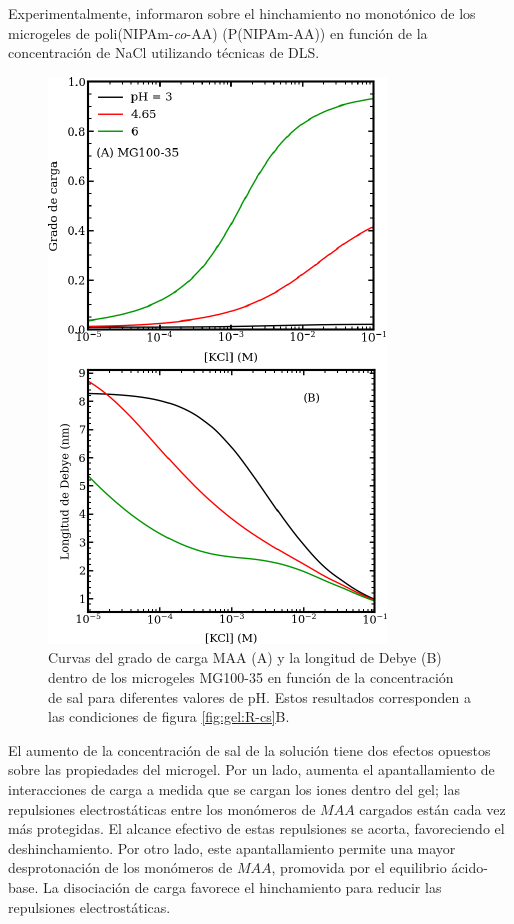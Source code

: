 Experimentalmente, \citet{CaprilesGonzalez2008} informaron sobre el hinchamiento no monot\'onico de los microgeles de poli(NIPAm-\emph{co}-AA) (P(NIPAm-AA)) en funci\'on de la concentraci\'on de NaCl utilizando t\'ecnicas de DLS.




\begin{figure}[!tb]
	\centering
	\includegraphics[width=0.5\linewidth]{Figures/graph-gel/f-cs.pdf}
	\caption{Curvas del grado de carga MAA (A) y la longitud de Debye (B) dentro de los microgeles MG100-35 en funci\'on de la concentraci\'on de sal para diferentes valores de pH.
		Estos resultados corresponden a las condiciones de figura \ref{fig:gel:R-cs}B.}
	\label{fig:gel:f-cs}
\end{figure}

El aumento de la concentraci\'on de sal de la soluci\'on tiene dos efectos opuestos sobre las propiedades del microgel. Por un lado, aumenta el apantallamiento de interacciones de carga a medida que se cargan los iones dentro del gel; las repulsiones electrost\'aticas entre los mon\'omeros de $MAA$ cargados est\'an cada vez m\'as protegidas. El alcance efectivo de estas repulsiones se acorta, favoreciendo el deshinchamiento. Por otro lado, este apantallamiento permite una mayor desprotonaci\'on de los mon\'omeros de $MAA$, promovida por el equilibrio \'acido-base. La disociaci\'on de carga favorece el hinchamiento para reducir las repulsiones electrost\'aticas.

